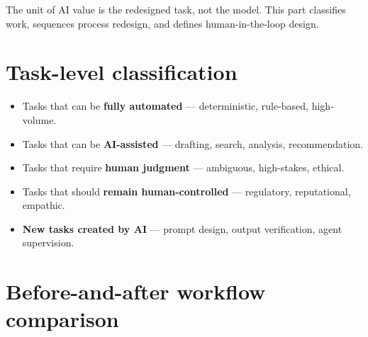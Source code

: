 
The unit of AI value is the redesigned task, not the model. This part
classifies work, sequences process redesign, and defines human-in-the-loop
design.

\section{Task-level classification}

\begin{itemize}
  \item Tasks that can be \textbf{fully automated} — deterministic, rule-based, high-volume.
  \item Tasks that can be \textbf{AI-assisted} — drafting, search, analysis, recommendation.
  \item Tasks that require \textbf{human judgment} — ambiguous, high-stakes, ethical.
  \item Tasks that should \textbf{remain human-controlled} — regulatory, reputational, empathic.
  \item \textbf{New tasks created by AI} — prompt design, output verification, agent supervision.
\end{itemize}

\section{Before-and-after workflow comparison}

\begin{center}
  \renewcommand{\arraystretch}{1.5}
\end{center}

